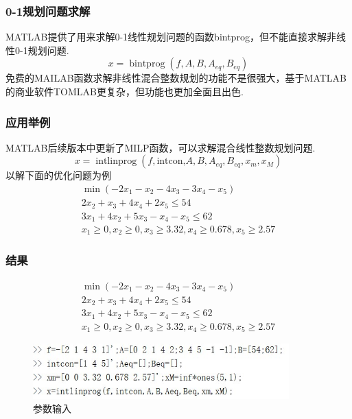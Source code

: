 \documentclass{beamer}
\begin{document}
\begin{CJK}{UTF8}{song}
\begin{frame}[allowframebreaks]
\frametitle{0-1规划问题求解}

MATLAB提供了用来求解0-1线性规划问题的函数bintprog，但不能直接求解非线性0-1规划问题.
\begin{equation}
x=\operatorname{bintprog}\left(f, A, B, A_{e q}, B_{e q}\right)
\end{equation}
免费的MAILAB函数求解非线性混合整数规划的功能不是很强大，基于MATLAB的商业软件TOMLAB更复杂，但功能也更加全面且出色.
\end{frame}

\begin{frame}[allowframebreaks]
\frametitle{应用举例}

MATLAB后续版本中更新了MILP函数，可以求解混合线性整数规划问题.
\begin{equation}
x=\operatorname{intlinprog}\left(f, \text {intcon,} A, B, A_{e q}, B_{e q}, x_{m}, x_{M}\right)
\end{equation}
以解下面的优化问题为例
\begin{equation}
\begin{array}{c}
\min \left(-2 x_{1}-x_{2}-4 x_{3}-3 x_{4}-x_{5}\right) \\
2 x_{2}+x_{3}+4 x_{4}+2 x_{5} \leq 54 \\
3 x_{1}+4 x_{2}+5 x_{3}-x_{4}-x_{5} \leq 62 \\
x_{1} \geq 0, x_{2} \geq 0, x_{3} \geq 3.32, x_{4} \geq 0.678, x_{5} \geq 2.57
\end{array}
\end{equation}
\end{frame}

\begin{frame}[allowframebreaks]
\frametitle{结果}

\begin{equation}
\begin{array}{c}
\min \left(-2 x_{1}-x_{2}-4 x_{3}-3 x_{4}-x_{5}\right) \\
2 x_{2}+x_{3}+4 x_{4}+2 x_{5} \leq 54 \\
3 x_{1}+4 x_{2}+5 x_{3}-x_{4}-x_{5} \leq 62 \\
x_{1} \geq 0, x_{2} \geq 0, x_{3} \geq 3.32, x_{4} \geq 0.678, x_{5} \geq 2.57
\end{array}
\end{equation}
\begin{figure}
\centering
\includegraphics[width=0.88\textwidth]{test1.jpg}
\caption{参数输入}
\end{figure}


\end{frame}
\end{CJK}
\end{document}
